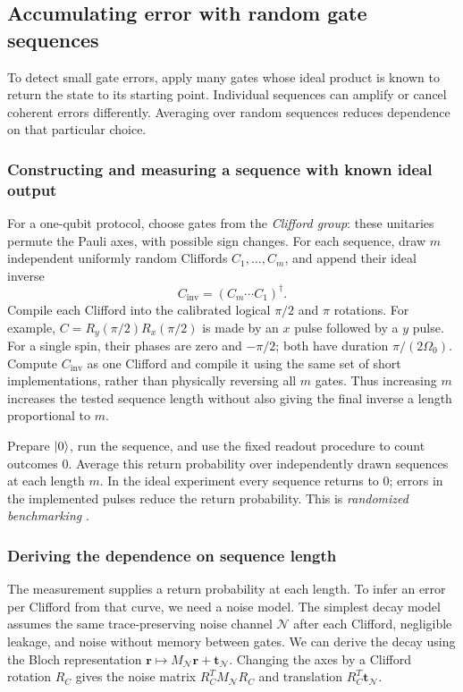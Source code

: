 \subsection{Accumulating error with random gate sequences}

To detect small gate errors, apply many gates whose ideal product
is known to return the state to its starting point. Individual
sequences can amplify or cancel coherent errors differently.
Averaging over random sequences reduces dependence on that
particular choice.

\subsubsection{Constructing and measuring a sequence with known ideal output}
For a one-qubit protocol, choose gates from the \emph{Clifford group}:
these unitaries permute the Pauli axes, with possible sign changes.
For each sequence, draw $m$ independent uniformly random Cliffords
$C_1,\ldots,C_m$, and append their ideal inverse
\[
 C_{\mathrm{inv}}=(C_m\cdots C_1)^\dagger.
\]
Compile each Clifford into the calibrated logical $\pi/2$ and
$\pi$ rotations. For example,
$C=R_y(\pi/2)R_x(\pi/2)$ is made by an $x$ pulse followed by a
$y$ pulse. For a single spin, their phases are zero and $-\pi/2$;
both have duration $\pi/(2\Omega_0)$. Compute $C_{\mathrm{inv}}$
as one Clifford and compile it using the same set of short
implementations, rather than physically reversing all $m$ gates.
Thus increasing $m$ increases the tested sequence length without
also giving the final inverse a length proportional to $m$.

Prepare $\lvert 0\rangle$, run the sequence, and use the fixed readout
procedure to count outcomes 0. Average this return probability
over independently drawn sequences at each length $m$.
In the ideal experiment every sequence returns to 0; errors in
the implemented pulses reduce the return probability. This is
\emph{randomized benchmarking}
\cite{Magesan2011}.

\subsubsection{Deriving the dependence on sequence length}
The measurement supplies a return probability at each length.
To infer an error per Clifford from that curve, we need a noise
model. The simplest decay model assumes the same trace-preserving noise
channel $\mathcal N$ after each Clifford, negligible leakage,
and noise without memory between gates. We can derive the decay
using the Bloch representation
$\mathbf r\mapsto M_{\mathcal N}\mathbf r+\mathbf t_{\mathcal N}$.
Changing the axes by a Clifford rotation $R_C$ gives the noise
matrix $R_C^T M_{\mathcal N}R_C$ and translation
$R_C^T\mathbf t_{\mathcal N}$.

